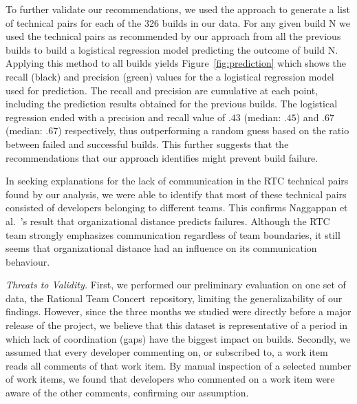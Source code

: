 To further validate our recommendations, we used the approach to generate a list of technical pairs for each of the 326 builds in our data. For any given build N we used the technical pairs as recommended by our approach from all the previous builds to build a logistical regression model predicting the outcome of build N. 
Applying this method to all builds yields Figure~\ref{fig:prediction} which shows the recall (black) and precision (green) values for the a logistical regression model used for prediction.
The recall and precision are cumulative at each point, including the prediction results obtained for the previous builds.
The logistical regression ended with a precision and recall value of $.43$ (median: $.45$) and $.67$ (median: $.67$) respectively, thus outperforming a random guess based on the ratio between failed and successful builds.
This further suggests that the recommendations that our approach identifies might prevent build failure. 


In seeking explanations for the lack of communication in the RTC technical pairs found by our analysis, we were able to identify that most of these technical pairs consisted of developers belonging to
different teams. This confirms Naggappan et al.~\cite{nagappan:icse:2008}'s result that organizational distance predicts failures. Although the RTC team strongly emphasizes communication
regardless of team boundaries, it still seems that organizational distance had
an influence on its communication behaviour.

\emph{Threats to Validity.}
\label{sec:threats}
First, we performed our preliminary evaluation on one set of data, the Rational Team Concert\texttrademark\
repository, limiting the generalizability of our findings.
However, since the three months  we studied were directly before a major release of the project, 
we believe that this dataset is representative of a period in which lack of coordination (gaps) have the biggest impact on builds. Secondly, we assumed that every developer commenting on, or subscribed to, a work item reads all comments of that work item. 
By manual inspection of a selected number of work items, we found that developers who commented on a work item were aware of the other comments, confirming our assumption.

